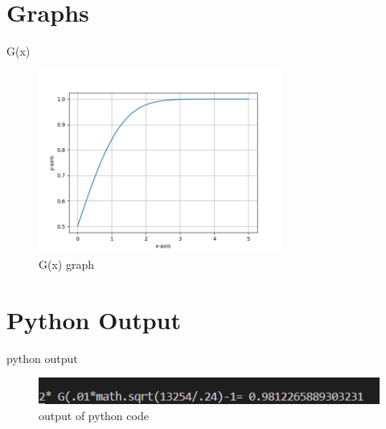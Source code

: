 \documentclass{beamer}
\begin{document}
\section{Graphs}
\begin{frame}{G(x)}
\begin{figure}[htb!]
    \centering
    \includegraphics[width=8cm]{figures/fig1.png}
    \caption{G(x) graph}
    \label{fig:my_label}
\end{figure}
    
\end{frame}
\section{Python Output}
\begin{frame}{python output}
\begin{figure}[htb!]
 
     \centering 
     
     
     \includegraphics[width=12cm]{figures/python_output.png}
    \caption{output of python code}
    \label{fig:2}
\end{figure}
    
\end{frame}
\end{document}
